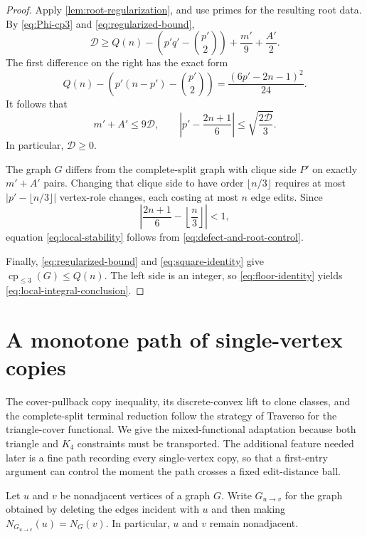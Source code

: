 \documentclass[11pt,reqno]{amsart}
\numberwithin{equation}{section}
\theoremstyle{definition}
\theoremstyle{remark}
\newcommand{\cple}[1]{\operatorname{cp}_{\leq #1}}
\begin{document}
\begin{proof}
Apply \cref{lem:root-regularization}, and use primes for the resulting root
data.  By \eqref{eq:Phi-cp3} and \eqref{eq:regularized-bound},
\begin{equation}\label{eq:deficit-lower}
  \mathcal{D}
  \geq Q(n)-\left(p'q'-\binom{p'}2\right)
      +\frac{m'}9+\frac{A'}2.
\end{equation}
The first difference on the right has the exact form
\begin{equation}\label{eq:square-identity}
  Q(n)-\left(p'(n-p')-\binom{p'}2\right)
  =\frac{(6p'-2n-1)^2}{24}.
\end{equation}
It follows that
\begin{equation}\label{eq:defect-and-root-control}
  m'+A'\leq9\mathcal{D},
  \qquad
  \left|p'-\frac{2n+1}{6}\right|
  \leq\sqrt{\frac{2\mathcal{D}}3}.
\end{equation}
In particular, $\mathcal{D}\geq0$.

The graph $G$ differs from the complete-split graph with clique side $P'$ on
exactly $m'+A'$ pairs.  Changing that clique side to have order
$\lfloor n/3\rfloor$ requires at most
$|p'-\lfloor n/3\rfloor|$ vertex-role changes, each costing at most $n$ edge
edits.  Since
\[
  \left|\frac{2n+1}{6}-\left\lfloor\frac n3\right\rfloor\right|<1,
\]
equation \eqref{eq:local-stability} follows from
\eqref{eq:defect-and-root-control}.

Finally, \eqref{eq:regularized-bound} and \eqref{eq:square-identity} give
$\cple{3}(G)\leq Q(n)$.  The left side is an integer, so
\eqref{eq:floor-identity} yields \eqref{eq:local-integral-conclusion}.
\end{proof}

\section{A monotone path of single-vertex copies}

The cover-pullback copy inequality, its discrete-convex lift to clone
classes, and the complete-split terminal reduction follow the strategy of
Traverso \cite[Sections~3--5]{TraversoPaperII2026} for the triangle-cover
functional.  We give the mixed-functional adaptation because both triangle
and $K_4$ constraints must be transported.  The additional feature needed
later is a fine path recording every single-vertex copy, so that a first-entry
argument can control the moment the path crosses a fixed edit-distance ball.

Let $u$ and $v$ be nonadjacent vertices of a graph $G$.  Write
$G_{u\to v}$ for the graph obtained by deleting the edges incident with $u$
and then making $N_{G_{u\to v}}(u)=N_G(v)$.  In particular, $u$ and $v$
remain nonadjacent.
\end{document}
